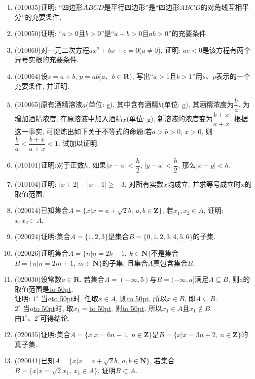 \documentclass[10pt,a4paper]{article}
\newcommand{\blank}[1]{\underline{\hbox to #1pt{}}}
\begin{document}
\begin{enumerate}[1.]
\vspace*{16ex}
\item {\tiny (010035)}证明: ``四边形$ABCD$是平行四边形''是``四边形$ABCD$的对角线互相平分''的充要条件.
\item {\tiny (010050)}证明: ``$a>0$且$b>0$''是``$a+b>0$且$ab>0$''的充要条件.
\item {\tiny (010060)}对一元二次方程$ax^2+bx+c=0$($a\ne 0$), 证明: $ac<0$是该方程有两个异号实根的充要条件.
\item {\tiny (010064)}设$s=a+b$, $p=ab$($a$、$b\in\mathbf{R}$), 写出``$a>1$且$b>1$''用$s$、$p$表示的一个充要条件, 并证明.
\item {\tiny (010065)}原有酒精溶液$a$(单位: $\text{g}$), 其中含有酒精$b$(单位: $\text{g}$), 其酒精浓度为$\dfrac ba$. 为增加酒精浓度, 在原溶液中加入酒精$x$(单位: $\text{g}$), 新溶液的浓度变为$\dfrac{b+x}{a+x}$. 根据这一事实, 可提炼出如下关于不等式的命题:若$a>b>0$, $x>0$, 则$\dfrac ba<\dfrac{b+x}{a+x}<1$. 试加以证明.
\item {\tiny (010101)}证明:对于正数$h$, 如果$|x-a| <\dfrac h2$, $|y-a| <\dfrac h2$, 那么$|x-y| <h$.
\item {\tiny (010104)}证明: $|x+2|-|x-1|\ge -3$, 对所有实数$x$均成立, 并求等号成立时$x$的取值范围.
\item {\tiny (020014)}已知集合$A=\{x|x=a+\sqrt 2b,\ a,b\in \mathbf{Z}\}$, 若$x_1,x_2\in A$, 证明: $x_1x_2\in A$.
\item {\tiny (020024)}证明:集合$A=\{1,2,3\}$是集合$B=\{0,1,2,3,4,5,6\}$的子集.
\item {\tiny (020026)}证明集合$A=\{n|n=2k-1,\ k\in \mathbf{N}\}$不是集合$B=\{n|n=2m+1, \ m\in \mathbf{N}\}$的子集, 且集合$A$真包含集合$B$.
\item {\tiny (020030)}设常数$a\in \mathbf{R}$. 若集合$A=(-\infty ,5)$与$B=(-\infty ,a]$满足$A\subseteq B$, 则$a$的取值范围是\blank{50}.\\
证明: $1^\circ$ 当$a$\blank{50}时, 任取$x\in A$, 则\blank{50}, 所以$x\in B$, 即$A\subseteq B$.\\ 
$2^\circ$ 当$a$\blank{50}时, 取$x_1=$\blank{50}, 则\blank{50}, 所以$x_1\in A$且$x_1\not \in B$.\\
由$1^\circ$、$2^\circ$可得结论.
\item {\tiny (020035)}证明:集合$A=\{x|x=6n-1, \ n\in\mathbf{Z}\}$是$B=\{x|x=3n+2, \ n\in\mathbf{Z}\}$的真子集.

\vspace*{16ex}
\item {\tiny (020041)}已知$A=\{x|x=a+\sqrt 2b,\ a,b\in \mathbf{N}\}$, 若集合$B=\{x|x=\sqrt 2x_1,\  x_1 \in A\}$, 证明$B\subset A$.


\end{enumerate}
\end{document}
